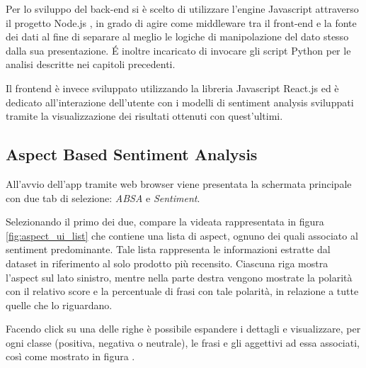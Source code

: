 \documentclass[hidelinks, 12pt]{article}
\begin{document}
Per lo sviluppo del back-end si è scelto di utilizzare l'engine Javascript attraverso il progetto Node.js \cite{site:nodejs}, in grado di agire come middleware tra il front-end e la fonte dei dati al fine di separare al meglio le logiche di manipolazione del dato stesso dalla sua presentazione. \'E inoltre incaricato di invocare gli script Python per le analisi descritte nei capitoli precedenti.

Il frontend è invece sviluppato utilizzando la libreria Javascript React.js \cite{site:react} ed è dedicato all'interazione dell'utente con i modelli di sentiment analysis sviluppati tramite la visualizzazione dei risultati ottenuti con quest'ultimi.



\subsection{Aspect Based Sentiment Analysis}
\label{sec:ui_abas}

All'avvio dell'app tramite web browser viene presentata la schermata principale con due tab di selezione: {\it ABSA} e {\it Sentiment}.

Selezionando il primo dei due, compare la videata rappresentata in figura \ref{fig:aspect_ui_list}  che contiene una lista di aspect, ognuno dei quali associato al sentiment predominante. Tale lista rappresenta le informazioni estratte dal dataset in riferimento al solo prodotto più recensito. Ciascuna riga mostra l'aspect sul lato sinistro, mentre nella parte destra vengono mostrate la polarità con il relativo score e la percentuale di frasi con tale polarità, in relazione a tutte quelle che lo riguardano. 

Facendo click su una delle righe è possibile espandere i dettagli e visualizzare, per ogni classe (positiva, negativa o neutrale), le frasi e gli aggettivi ad essa associati, così come mostrato in figura .
\end{document}

